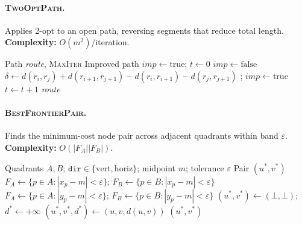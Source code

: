 \documentclass[runningheads]{llncs}
\begin{document}
\paragraph{\textsc{TwoOptPath}.}
Applies 2-opt to an open path, reversing segments that reduce total
length. \textbf{Complexity:} $O(m^2)$/iteration.

\begin{algorithm}
\caption{\textsc{TwoOptPath} — 2-opt for open path}
\label{alg:twoopt}
\begin{algorithmic}[1]
\Require Path \textit{route}, \textsc{MaxIter}
\Ensure  Improved path
\State $\textit{imp}\gets\mathrm{true}$;\; $t\gets 0$
  \State $\textit{imp}\gets\mathrm{false}$
      \State $\delta\gets d(r_i,r_j)+d(r_{i+1},r_{j+1})
                       -d(r_i,r_{i+1})-d(r_j,r_{j+1})$
        \State {};\;
               $\textit{imp}\gets\mathrm{true}$
      \EndIf
    \EndFor
  \EndFor
  \State $t\gets t+1$
\EndWhile
\State \Return \textit{route}
\end{algorithmic}
\end{algorithm}

\paragraph{\textsc{BestFrontierPair}.}
Finds the minimum-cost node pair across adjacent quadrants within
band $\varepsilon$. \textbf{Complexity:} $O(|F_A||F_B|)$.

\begin{algorithm}
\caption{\textsc{BestFrontierPair} — Minimum-cost cross-boundary pair}
\label{alg:frontier}
\begin{algorithmic}[1]
\Require Quadrants $A,B$;\;
         $\texttt{dir}\in\{\text{vert},\text{horiz}\}$;\;
         midpoint $m$;\; tolerance $\varepsilon$
\Ensure  Pair $(u^*,v^*)$
  \State $F_A\gets\{p\in A:|x_p-m|<\varepsilon\}$;\;
         $F_B\gets\{p\in B:|x_p-m|<\varepsilon\}$
\Else
  \State $F_A\gets\{p\in A:|y_p-m|<\varepsilon\}$;\;
         $F_B\gets\{p\in B:|y_p-m|<\varepsilon\}$
\EndIf
\State $(u^*,v^*)\gets(\bot,\bot)$;\; $d^*\gets+\infty$
    \;
      $(u^*,v^*,d^*)\gets(u,v,d(u,v))$
    \EndIf
  \EndFor
\EndFor
\State \Return $(u^*,v^*)$
\end{algorithmic}
\end{algorithm}
\end{document}
